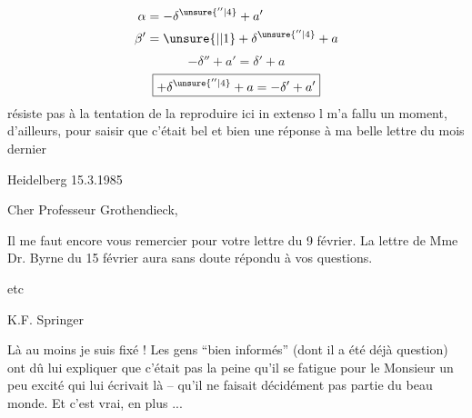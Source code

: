 \[\begin{aligned}
\alpha&=-\delta^{\unsure{''|4}}+a'\\
\beta'&=\unsure{\vert|1}+\delta^{\unsure{''|4}}+a
\end{aligned}\]
\[\boxed{-\delta''+a'=\delta'+a}\]
\[\boxed{+\delta^{\unsure{''|4}}+a=-\delta'+a'}\]
résiste pas à la tentation de la reproduire ici in extenso\deleted{\unsure{--}} l m'a fallu un moment, d'ailleurs, pour saisir que c'était bel et bien une réponse à ma belle lettre  du mois dernier\deleted{\unsure{;}}

\begin{flushright}Heidelberg 15.3.1985\end{flushright}
Cher Professeur Grothendieck,

Il me faut encore vous remercier pour votre lettre du 9 février. La lettre de Mme Dr. Byrne du 15 février aura sans doute répondu à vos questions.

 etc
\begin{flushright}K.F. Springer\end{flushright}

Là au moins je suis fixé ! Les gens ``bien informés'' (dont il a été déjà question) ont dû lui expliquer que c'était pas la peine qu'il se fatigue pour le Monsieur un peu excité qui lui écrivait là -- qu'il ne faisait décidément pas partie du beau monde. Et c'est vrai, en plus ...

